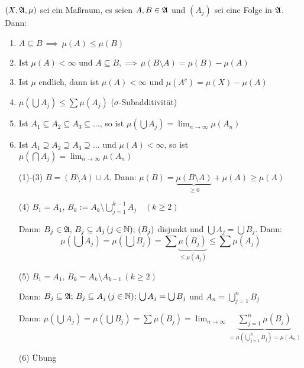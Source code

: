 \begin{satz}
\label{Satz 1.7}
\((X,\mathfrak{A},\mu)\) sei ein Maßraum, es seien \(A,B\in\mathfrak{A}\) und 
\((A_{j})\) sei eine Folge in \(\mathfrak{A}\). Dann:
\begin{enumerate}
\item \(A\subseteq B\,\implies\,\mu(A)\leq\mu(B)\)
\item Ist \(\mu(A)<\infty\) und \(A\subseteq B,\implies\,\mu(B\setminus A)=\mu(B)-\mu(A)\)
\item Ist \(\mu\) endlich, dann ist \(\mu(A)<\infty\) und \(\mu(A^{c})=\mu(X)-\mu(A)\)
\item \(\mu\left(\bigcup A_{j}\right)\leq\sum{\mu(A_{j})}\) (\(\sigma\)-Subadditivität)
\item Ist \(A_{1}\subseteq A_{2}\subseteq A_{3}\subseteq\dots\), so ist \(\mu(\bigcup A_{j})=\lim_{n\to\infty}{\mu(A_{n})}\)
\item Ist \(A_{1}\supseteq A_{2}\supseteq A_{3}\supseteq\dots\) und \(\mu(A)<\infty\), so ist
	\(\mu(\bigcap A_{j})=\lim_{n\to\infty}{\mu(A_{n})}\)
\end{enumerate}
\end{satz}
\begin{beweis}
\begin{enumerate}
\item[(1)-(3)] \(B=(B\setminus A)\cup A\). Dann: \(\mu(B)=\underbrace{\mu(B\setminus A)}_{\geq0}+\mu(A)\geq\mu(A)\)
\item[(4)] %
\(B_{1}=A_{1},\,B_{k}:=A_{k}\setminus\bigcup_{j=1}^{k-1}{A_{j}}\quad(k\geq 2)\)

Dann: \(B_{j}\in\mathfrak{A},\,B_{j}\subseteq A_{j}\,(j\in\mathbb{N});\,(B_{j})\) disjunkt und \(\bigcup A_{j}=\bigcup B_{j}\). Dann:
\[
\mu\left(\bigcup A_{j}\right)=\mu\left(\bigcup B_{j}\right)=\sum{\underbrace{\mu(B_{j})}_{\leq\mu(A_{j})}}\leq\sum{\mu(A_{j})}
\]
\item[(5)] %
\(B_{1}=A_{1},\,B_{k}=A_{k}\setminus A_{k-1}\,(k\geq 2)\)

Dann: \(B_{j}\subseteq\mathfrak{A};\,B_{j}\subseteq A_{j}\,(j\in\mathbb{N});\,\bigcup A_{j}=\bigcup B_{j}\) und \(A_{n}=\bigcup_{j=1}^{n}{B_{j}}\)%

Dann: \(\mu(\bigcup A_{j})=\mu(\bigcup B_{j})=\sum{\mu(B_{j})}=\lim_{n\to\infty}{\underbrace{\sum_{j=1}^{n}{\mu(B_{j})}}_{=\mu\left(\bigcup_{j=1}^{n}{B_{j}}\right)=\mu(A_{n})}}\)
\item[(6)] Übung
\end{enumerate}
\end{beweis}
